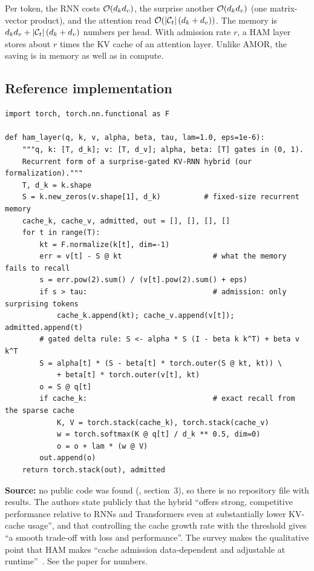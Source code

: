 Per token, the RNN costs $\mathcal{O}(d_kd_v)$, the surprise another $\mathcal{O}(d_kd_v)$ (one matrix-vector
product), and the attention read $\mathcal{O}(\left\lvert \mathcal{C}_t\right\rvert(d_k+d_v))$. The memory is
$d_kd_v+\left\lvert \mathcal{C}_t\right\rvert(d_k+d_v)$ numbers per head. With admission rate $r$, a HAM layer stores
about $r$ times the KV cache of an attention layer. Unlike AMOR, the saving is in memory as well as in
compute.

\subsection{Reference implementation}

\begin{lstlisting}[caption={Reference implementation (ours): surprise-gated KV admission over a gated delta-rule memory},label={lst:c13-ham-ref}]
import torch, torch.nn.functional as F

def ham_layer(q, k, v, alpha, beta, tau, lam=1.0, eps=1e-6):
    """q, k: [T, d_k]; v: [T, d_v]; alpha, beta: [T] gates in (0, 1).
    Recurrent form of a surprise-gated KV-RNN hybrid (our formalization)."""
    T, d_k = k.shape
    S = k.new_zeros(v.shape[1], d_k)          # fixed-size recurrent memory
    cache_k, cache_v, admitted, out = [], [], [], []
    for t in range(T):
        kt = F.normalize(k[t], dim=-1)
        err = v[t] - S @ kt                     # what the memory fails to recall
        s = err.pow(2).sum() / (v[t].pow(2).sum() + eps)
        if s > tau:                             # admission: only surprising tokens
            cache_k.append(kt); cache_v.append(v[t]); admitted.append(t)
        # gated delta rule: S <- alpha * S (I - beta k k^T) + beta v k^T
        S = alpha[t] * (S - beta[t] * torch.outer(S @ kt, kt)) \
            + beta[t] * torch.outer(v[t], kt)
        o = S @ q[t]
        if cache_k:                             # exact recall from the sparse cache
            K, V = torch.stack(cache_k), torch.stack(cache_v)
            w = torch.softmax(K @ q[t] / d_k ** 0.5, dim=0)
            o = o + lam * (w @ V)
        out.append(o)
    return torch.stack(out), admitted
\end{lstlisting}

\begin{results}
\textbf{Source:} no public code was found (, section~3), so there is no repository
file with results. The authors state publicly that the hybrid ``offers strong, competitive performance
relative to RNNs and Transformers even at substantially lower KV-cache usage'', and that controlling
the cache growth rate with the threshold gives ``a smooth trade-off with loss and performance''. The
survey makes the qualitative point that HAM makes ``cache admission data-dependent and adjustable at
runtime''~\citep{zhoubian2026memory}. See the paper for numbers.
\end{results}

